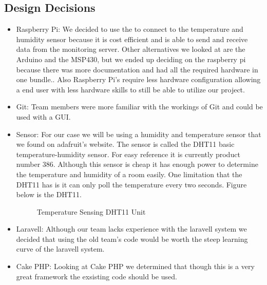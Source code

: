 \documentclass{report}
\begin{document}
\subsection*{Design Decisions}
\begin{itemize}
\item Raspberry Pi: We decided to use the to connect to the temperature and humidity sensor because it is cost efficient and is able to send and receive data from the monitoring server. Other alternatives we looked at are the Arduino and the MSP430, but we ended up deciding on the raspberry pi because there was more documentation and had all the required hardware in one bundle.. Also Raspberry Pi’s require less hardware configuration allowing a end user with less hardware skills to still be able to utilize our project.
\item Git: Team members were more familiar with the workings of Git and could be used with a GUI.
\item Sensor: For our case we will be using a humidity and temperature sensor that we found on adafruit's website.
The sensor is called the DHT11 basic temperature-humidity sensor. 
For easy reference it is currently product number 386.
Although this sensor is cheap it has enough power to determine the temperature and humidity of a room easily.
One limitation that the DHT11 has is it can only poll the temperature every two seconds.
Figure below is the DHT11.

\begin{figure}[H]
\caption{Temperature Sensing DHT11 Unit}
\end{figure}


\item Laravell: Although our team lacks experience with the laravell system we decided that using the old team's code would be worth the steep learning curve of the laravell system.
\item Cake PHP: Looking at Cake PHP we determined that though this is a very great framework the exsisting code should be used.
\end{itemize}
\end{document}
